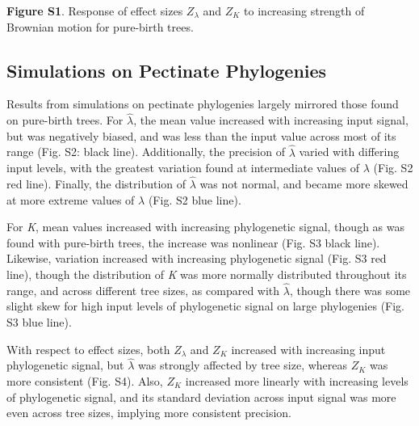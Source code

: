 \documentclass[
]{article}
\begin{document}
\textbf{Figure S1}. Response of effect sizes \(Z_{\lambda}\) and \(Z_K\)
to increasing strength of Brownian motion for pure-birth trees.

\newpage

\hypertarget{simulations-on-pectinate-phylogenies}{%
\subsection{Simulations on Pectinate
Phylogenies}\label{simulations-on-pectinate-phylogenies}}

Results from simulations on pectinate phylogenies largely mirrored those
found on pure-birth trees. For \(\hat{\lambda}\), the mean value
increased with increasing input signal, but was negatively biased, and
was less than the input value across most of its range (Fig. S2: black
line). Additionally, the precision of \(\hat{\lambda}\) varied with
differing input levels, with the greatest variation found at
intermediate values of \(\lambda\) (Fig. S2 red line). Finally, the
distribution of \(\hat{\lambda}\) was not normal, and became more skewed
at more extreme values of \(\lambda\) (Fig. S2 blue line). \hfill\break

For \emph{K}, mean values increased with increasing phylogenetic signal,
though as was found with pure-birth trees, the increase was nonlinear
(Fig. S3 black line). Likewise, variation increased with increasing
phylogenetic signal (Fig. S3 red line), though the distribution of
\emph{K} was more normally distributed throughout its range, and across
different tree sizes, as compared with \(\hat{\lambda}\), though there
was some slight skew for high input levels of phylogenetic signal on
large phylogenies (Fig. S3 blue line). \hfill\break

With respect to effect sizes, both \(Z_{\lambda}\) and \(Z_K\) increased
with increasing input phylogenetic signal, but \(\hat{\lambda}\) was
strongly affected by tree size, whereas \(Z_K\) was more consistent
(Fig. S4). Also, \(Z_K\) increased more linearly with increasing levels
of phylogenetic signal, and its standard deviation across input signal
was more even across tree sizes, implying more consistent precision.
\end{document}

